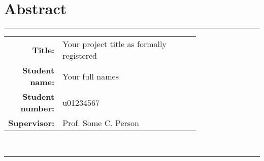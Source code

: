 \chapter*{Abstract}

\hrule\medskip
\begin{tabular}{rp{0.75\linewidth}}
	\textbf{Title:} & Your project title as formally registered \\
	\textbf{Student name:} & Your full names \\
	\textbf{Student number:} & u01234567 \\
	\textbf{Supervisor:} & Prof. Some C. Person
\end{tabular}\medskip\\
\hrule \bigskip

{\flushleft \lipsum[1]}

\lipsum[2-3]